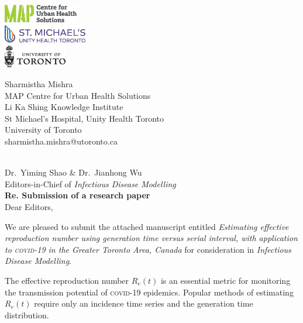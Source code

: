 \documentclass{article}
\newcommand{\covid}{\textsc{covid-19}\xspace}
\begin{document}
\begin{minipage}{0.5\linewidth}
  \includegraphics[height=0.8cm]{map-cuhs.eps}\\[1ex]
  \includegraphics[height=0.8cm]{smh.eps}     \\[1ex]
  \includegraphics[height=1.0cm]{uoft.eps}
\end{minipage}%
\begin{minipage}{0.5\linewidth}
  \begin{flushright}\small
    Sharmistha Mishra\\
    MAP Centre for Urban Health Solutions\\
    Li Ka Shing Knowledge Institute\\
    St Michael's Hospital,
    Unity Health Toronto\\
    University of Toronto\\
    sharmistha.mishra@utoronto.ca
  \end{flushright}
\end{minipage}
\\[3ex]
Dr.\ Yiming Shao \& Dr.\ Jianhong Wu\\
Editors-in-Chief of \textit{Infectious Disease Modelling}\\[2ex]
\textbf{Re. Submission of a research paper}\\[2ex]
Dear Editors,
\par
We are pleased to submit the attached manuscript entitled
\textit{Estimating effective reproduction number using
  generation time versus serial interval, with application to \covid
  in the Greater Toronto Area, Canada}
for consideration in \textit{Infectious Disease Modelling}.
\par
The effective reproduction number $R_e(t)$ is an essential metric
for monitoring the transmission potential of \covid epidemics.
Popular methods of estimating $R_e(t)$ require only
an incidence time series and the generation time distribution.
\end{document}
